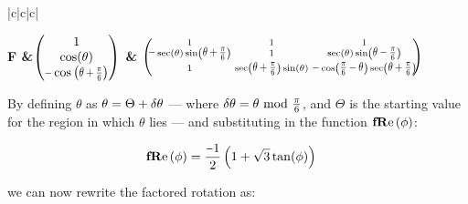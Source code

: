 \begin{tabular}{|c|c|c|}
\hline \rule[-2ex]{0pt}{5.5ex} \bf{F} &\( 
\left(\!\!\!
\begin{array}{c}
 1 \\
 \cos (\theta ) \\
 \um\cosine{\theta +\Pii{6}} \\
\end{array}
\!\!\!\right)\)   & \( \left(\!\!\!
\begin{smallmatrix}
 1 & 1 & 1 \\
 \um\sec (\theta ) \sine{\theta +\Pii{6}} & 1 & \sec (\theta ) \sine{\theta-\Pii{6}} \\
 1 & \secant{\theta +\Pii{6}} \sin (\theta ) & \um\cosine{\Pii{6}-\theta } \secant{\theta +\Pii{6}} \\
\end{smallmatrix}
\!\!\!\right)  \)  \\ 
\hline 
\end{tabular} 

By defining $\theta$ as $\theta  = \Theta + \delta\theta$ --- where $\thetaA = \theta \!\!\mod \Pii{6}$, and $\Theta$ is the starting value for the region in which $\theta$ lies --- and substituting in the function $\fRe[\phi] $:

\begin{align}
\fRe[\phi] &= \frac{\um 1}{2} \left(1+\sqrt{3} \tan (\phi )\right) 
\end{align}

we can now rewrite the factored rotation as:

